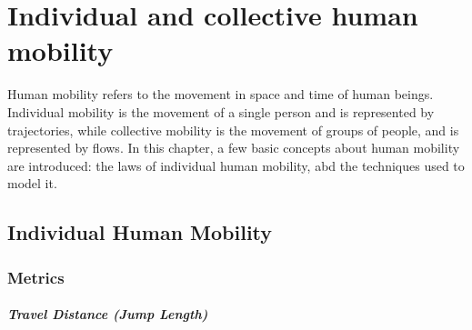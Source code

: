 \chapter{Individual and collective human mobility}

Human mobility refers to the movement in space and time of human beings. Individual mobility is the movement of a single person and is represented by trajectories, while collective mobility is the movement of groups of people, and is represented by flows.  In this chapter, a few basic concepts about human mobility are introduced: the laws of individual human mobility, abd the techniques used to model it.

\section{Individual Human Mobility}

\subsection{Metrics}

\paragraph{Travel Distance (Jump Length)}

